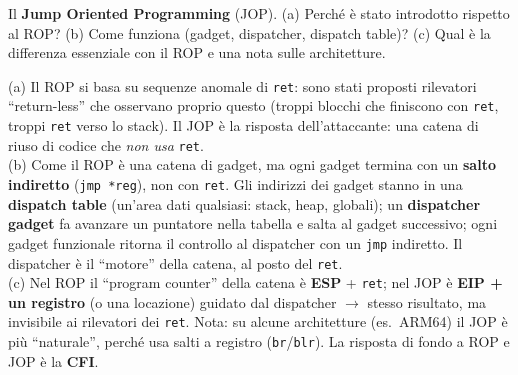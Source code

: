 \question[6]
Il \textbf{Jump Oriented Programming} (JOP). (a) Perché è stato introdotto rispetto al ROP? (b) Come funziona (gadget, dispatcher, dispatch table)? (c) Qual è la differenza essenziale con il ROP e una nota sulle architetture.
\begin{solution}
(a) Il ROP si basa su sequenze anomale di \lstinline|ret|: sono stati proposti rilevatori ``return-less'' che osservano proprio questo (troppi blocchi che finiscono con \lstinline|ret|, troppi \lstinline|ret| verso lo stack). Il JOP è la risposta dell'attaccante: una catena di riuso di codice che \emph{non usa} \lstinline|ret|.\\
(b) Come il ROP è una catena di gadget, ma ogni gadget termina con un \textbf{salto indiretto} (\lstinline|jmp *reg|), non con \lstinline|ret|. Gli indirizzi dei gadget stanno in una \textbf{dispatch table} (un'area dati qualsiasi: stack, heap, globali); un \textbf{dispatcher gadget} fa avanzare un puntatore nella tabella e salta al gadget successivo; ogni gadget funzionale ritorna il controllo al dispatcher con un \lstinline|jmp| indiretto. Il dispatcher è il ``motore'' della catena, al posto del \lstinline|ret|.\\
(c) Nel ROP il ``program counter'' della catena è \textbf{ESP} + \lstinline|ret|; nel JOP è \textbf{EIP + un registro} (o una locazione) guidato dal dispatcher $\to$ stesso risultato, ma invisibile ai rilevatori dei \lstinline|ret|. Nota: su alcune architetture (es.\ ARM64) il JOP è più ``naturale'', perché usa salti a registro (\lstinline|br|/\lstinline|blr|). La risposta di fondo a ROP e JOP è la \textbf{CFI}.
\end{solution}
